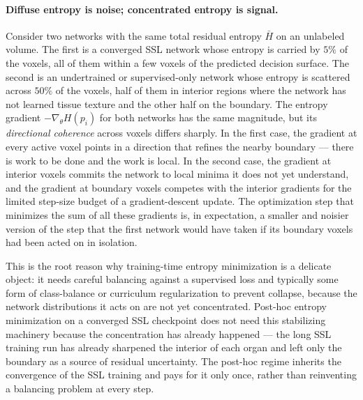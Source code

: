 \paragraph{Diffuse entropy is noise; concentrated entropy is signal.}
Consider two networks with the same total residual entropy $\bar H$ on an unlabeled volume. The first is a converged SSL network whose entropy is carried by $5\%$ of the voxels, all of them within a few voxels of the predicted decision surface. The second is an undertrained or supervised-only network whose entropy is scattered across $50\%$ of the voxels, half of them in interior regions where the network has not learned tissue texture and the other half on the boundary. The entropy gradient $-\nabla_\theta H(p_i)$ for both networks has the same magnitude, but its \emph{directional coherence} across voxels differs sharply. In the first case, the gradient at every active voxel points in a direction that refines the nearby boundary --- there is work to be done and the work is local. In the second case, the gradient at interior voxels commits the network to local minima it does not yet understand, and the gradient at boundary voxels competes with the interior gradients for the limited step-size budget of a gradient-descent update. The optimization step that minimizes the sum of all these gradients is, in expectation, a smaller and noisier version of the step that the first network would have taken if its boundary voxels had been acted on in isolation.

This is the root reason why training-time entropy minimization is a delicate object: it needs careful balancing against a supervised loss and typically some form of class-balance or curriculum regularization to prevent collapse, because the network distributions it acts on are not yet concentrated. Post-hoc entropy minimization on a converged SSL checkpoint does not need this stabilizing machinery because the concentration has already happened --- the long SSL training run has already sharpened the interior of each organ and left only the boundary as a source of residual uncertainty. The post-hoc regime inherits the convergence of the SSL training and pays for it only once, rather than reinventing a balancing problem at every step.

